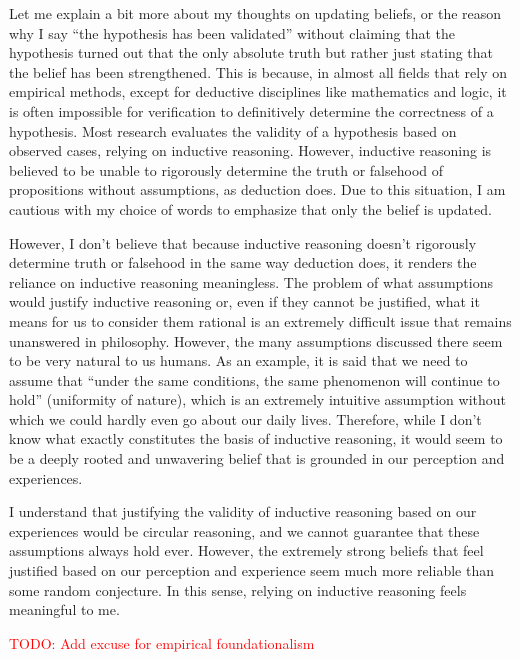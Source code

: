 \documentclass{book}
\begin{document}
Let me explain a bit more about my thoughts on updating beliefs, or the reason why I say ``the hypothesis has been validated'' without claiming that the hypothesis turned out that the only absolute truth but rather just stating that the belief has been strengthened. This is because, in almost all fields that rely on empirical methods, except for deductive disciplines like mathematics and logic, it is often impossible for verification to definitively determine the correctness of a hypothesis. Most research evaluates the validity of a hypothesis based on observed cases, relying on inductive reasoning. However, inductive reasoning is believed to be unable to rigorously determine the truth or falsehood of propositions without assumptions, as deduction does. Due to this situation, I am cautious with my choice of words to emphasize that only the belief is updated.

However, I don't believe that because inductive reasoning doesn't rigorously determine truth or falsehood in the same way deduction does, it renders the reliance on inductive reasoning meaningless. The problem of what assumptions would justify inductive reasoning or, even if they cannot be justified, what it means for us to consider them rational is an extremely difficult issue that remains unanswered in philosophy. However, the many assumptions discussed there seem to be very natural to us humans. As an example, it is said that we need to assume that ``under the same conditions, the same phenomenon will continue to hold'' (uniformity of nature), which is an extremely intuitive assumption without which we could hardly even go about our daily lives. Therefore, while I don't know what exactly constitutes the basis of inductive reasoning, it would seem to be a deeply rooted and unwavering belief that is grounded in our perception and experiences.

I understand that justifying the validity of inductive reasoning based on our experiences would be circular reasoning, and we cannot guarantee that these assumptions always hold ever. However, the extremely strong beliefs that feel justified based on our perception and experience seem much more reliable than some random conjecture. In this sense, relying on inductive reasoning feels meaningful to me.

\textcolor{red}{TODO: Add excuse for empirical foundationalism}
\end{document}
